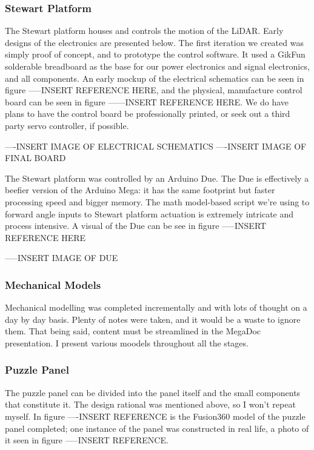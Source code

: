 \documentclass[a4paper, 10pt]{article}
\begin{document}
 		\subsubsection*{Stewart Platform}
 		The Stewart platform houses and controls the motion of the LiDAR. Early designs of the electronics are presented below. The first iteration we created was simply proof of concept, and to prototype the control software. It used a GikFun solderable breadboard as the base for our power electronics and signal electronics, and all components. An early mockup of the electrical schematics can be seen in figure -----INSERT REFERENCE HERE, and the physical, manufacture control board can be seen in figure ------INSERT REFERENCE HERE. We do have plans to have the control board be professionally printed, or seek out a third party servo controller, if possible.
 		
 		----INSERT IMAGE OF ELECTRICAL SCHEMATICS
 		----INSERT IMAGE OF FINAL BOARD
 		
 		The Stewart platform was controlled by an Arduino Due. The Due is effectively a beefier version of the Arduino Mega: it has the same footprint but faster processing speed and bigger memory. The math model-based script we're using to forward angle inputs to Stewart platform actuation is extremely intricate and process intensive. A visual of the Due can be see in figure -----INSERT REFERENCE HERE
 		
 		-----INSERT IMAGE OF DUE
 
 		\subsubsection{Mechanical Models}
 		Mechanical modelling was completed incrementally and with lots of thought on a day by day basis. Plenty of notes were taken, and it would be a waste to ignore them. That being said, content must be streamlined in the MegaDoc presentation. I present various moodels throughout all the stages.
 		\subsubsection*{Puzzle Panel}
		The puzzle panel can be divided into the panel itself and the small components that constitute it. The design rational was mentioned above, so I won't repeat myself. In figure ----INSERT REFERENCE is the Fusion360 model of the puzzle panel completed; one instance of the panel was constructed in real life, a photo of it seen in figure -----INSERT REFERENCE.
		
\end{document}
